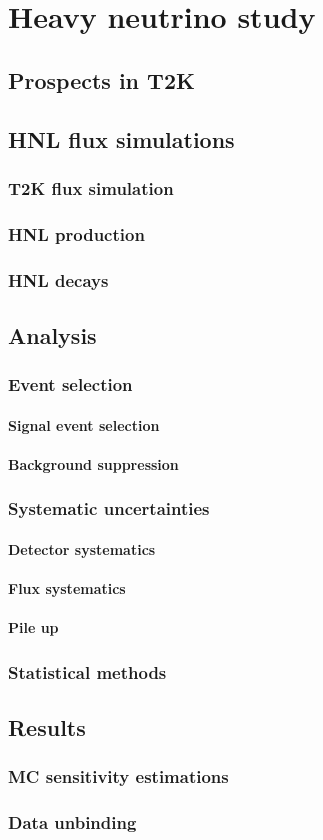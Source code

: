 \documentclass[../main.tex]{subfiles}
\begin{document}
\part{Heavy neutrino study}

\chapter{Prospects in T2K}
\chapter{HNL flux simulations}
\section{T2K flux simulation}
\section{HNL production}
\section{HNL decays}
\chapter{Analysis}
\section{Event selection}
\subsection{Signal event selection}
\subsection{Background suppression}
\section{Systematic uncertainties}
\subsection{Detector systematics}
\subsection{Flux systematics}
\subsection{Pile up}
\section{Statistical methods}
\chapter{Results}
\section{MC sensitivity estimations}
\section{Data unbinding}
\end{document}

